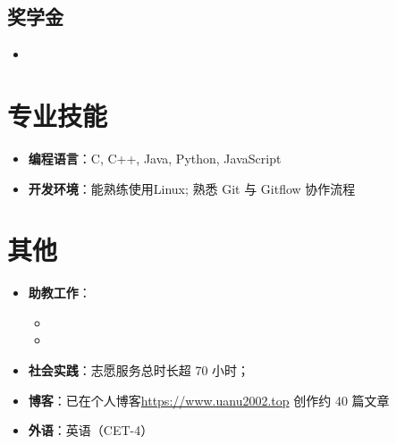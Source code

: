 \documentclass{resume}
\begin{document}
\subsection{\textbf{奖学金}}
\begin{itemize}
  \item {}
\end{itemize}

\section{专业技能}
\begin{itemize}
  \item \textbf{编程语言}：C, C++, Java, Python, JavaScript
  \item \textbf{开发环境}：能熟练使用Linux; 熟悉 Git 与 Gitflow 协作流程
\end{itemize}

\section{其他}
\begin{itemize}
  \item \textbf{助教工作}：
        \begin{itemize}
          \item {}
	     \item {}
        \end{itemize}
  \item \textbf{社会实践}：志愿服务总时长超 70 小时；
  \item \textbf{博客}：已在个人博客\url{https://www.uanu2002.top} 创作约 40 篇文章
  \item \textbf{外语}：英语（CET-4）
\end{itemize}
\end{document}
